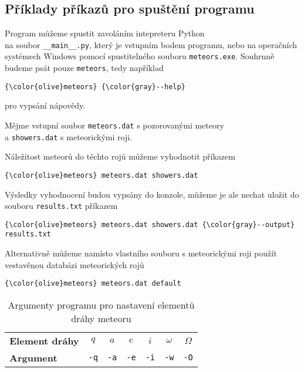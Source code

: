 \subsection{Příklady příkazů pro spuštění programu\label{sec:practical:examples}}%
Program můžeme spustit zavoláním intepreteru Python \\na soubor \texttt{\_\_main\_\_.py}, který je vstupním bodem programu, nebo na operačních systémech Windows pomocí spustitelného souboru \texttt{meteors.exe}. Souhrnně budeme psát pouze \texttt{meteors}, tedy například
\begin{Verbatim}[commandchars=\\\{\},gobble=4,formatcom=\small]
    {\color{olive}meteors} {\color{gray}--help}
\end{Verbatim}
pro vypsání nápovědy.

\medskip

Mějme vstupní soubor \texttt{meteors.dat} s pozorovanými meteory \\a \texttt{showers.dat} s meteorickými roji.

Náležitost meteorů do těchto rojů můžeme vyhodnotit příkazem
\begin{Verbatim}[commandchars=\\\{\},gobble=4,formatcom=\small]
    {\color{olive}meteors} meteors.dat showers.dat
\end{Verbatim}
Výsledky vyhodnocení budou vypsány do konzole, můžeme je ale nechat uložit do souboru \texttt{results.txt} příkazem
\begin{Verbatim}[commandchars=\\\{\},gobble=4,formatcom=\small]
    {\color{olive}meteors} meteors.dat showers.dat {\color{gray}--output} results.txt
\end{Verbatim}
Alternativně můžeme namísto vlastního souboru s meteorickými roji použít vestavěnou databázi meteorických rojů
\begin{Verbatim}[commandchars=\\\{\},gobble=4,formatcom=\small]
    {\color{olive}meteors} meteors.dat default
\end{Verbatim}

\begin{table}[!h]
    \centering
    \caption{Argumenty programu pro nastavení elementů dráhy meteoru}
    \begin{tabular}[pos]{|l|cccccc|}
        \hline
        \textbf{Element dráhy} & $q$ & $a$ & $e$ & $i$ & $\omega$ & $\Omega$ \\
        \textbf{Argument} & \texttt{-q} & \texttt{-a} & \texttt{-e} & \texttt{-i} & \texttt{-w} & \texttt{-O} \\
        \hline
    \end{tabular}
    \label{tbl:practical:arguments}
\end{table}

